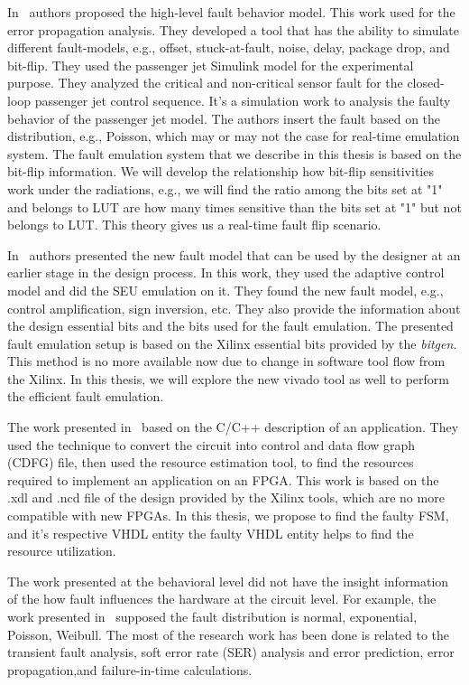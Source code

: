 In~\citep{janschek2017errorsim} authors proposed the high-level fault behavior model. This work used for the error propagation analysis. They developed a tool that has the ability to simulate different fault-models, e.g., offset, stuck-at-fault, noise, delay, package drop, and bit-flip. They used the passenger jet Simulink model for the experimental purpose. They analyzed the critical and non-critical sensor fault for the closed-loop passenger jet control sequence. It's  a simulation work to analysis the faulty behavior of the passenger jet model.  The authors insert the fault based on the distribution, e.g., Poisson, which may or may not the case for real-time emulation system. The fault emulation system that we describe in this thesis is based on the bit-flip information. We will develop the relationship how bit-flip sensitivities work under the radiations,  e.g., we will find the ratio among the bits set at "1" and belongs to LUT are how many times sensitive than the bits set at "1" but not belongs to LUT. This theory gives us a real-time fault flip scenario.

In~\citep{hobeika2013flight} authors presented the new fault model that can be used by the designer at an earlier stage in the design process. In this work, they used the adaptive control model and did the SEU emulation on it. They found the new fault model, e.g., control amplification, sign inversion, etc. They also provide the information about the design essential bits and the bits used for the fault emulation. The presented fault emulation setup is based on the Xilinx essential bits provided by the \textit{bitgen}. This method is no more available now due to change in software tool flow from the Xilinx. In this thesis, we will explore the new vivado tool as well to perform the efficient fault emulation. 

The work presented in~\citep{thibeault2013library} based on the C/C++ description of an application. They used the technique to convert the circuit into control and data flow graph (CDFG) file, then used the resource estimation tool, to find the resources required to implement an application on an FPGA. This work is based on the .xdl and .ncd file of the design provided by the Xilinx tools, which are no more compatible with new FPGAs. In this thesis, we propose to find the faulty FSM, and it's respective VHDL entity the faulty VHDL entity helps to find the resource utilization. 


The work presented at the behavioral level did not have the insight information of the how fault influences the hardware at the circuit level. For example, the work presented in~\citep{janschek2017errorsim} supposed the fault distribution is normal, exponential, Poisson, Weibull. The most of the research work has been done is related to the transient fault analysis, soft error rate (SER) analysis and error prediction, error propagation,and failure-in-time calculations.



